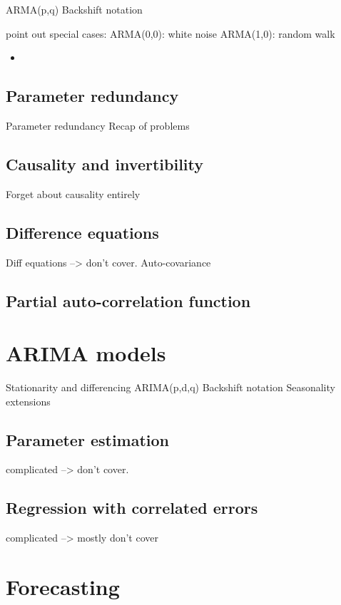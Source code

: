 \documentclass{article}
\begin{document}
ARMA(p,q)
Backshift notation

point out special cases: 
ARMA(0,0): white noise
ARMA(1,0): random walk 

\begin{itemize}
\item
\end{itemize}

\subsection{Parameter redundancy}

Parameter redundancy
Recap of problems

\subsection{Causality and invertibility}

Forget about causality entirely

\subsection{Difference equations}

Diff equations --> don't cover.
Auto-covariance

\subsection{Partial auto-correlation function}

\section{ARIMA models}

Stationarity and differencing
ARIMA(p,d,q)
Backshift notation
Seasonality extensions

\subsection{Parameter estimation}

complicated --> don't cover.

\subsection{Regression with correlated errors}

complicated --> mostly don't cover

\section{Forecasting}
\end{document}
